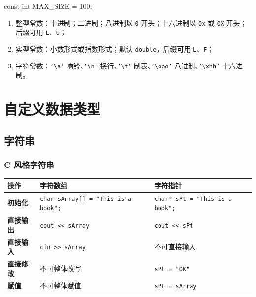 \documentclass[UTF8,fontset=fandol,zihao=5]{ctexart}
\newcommand{\code}[1]{\texttt{#1}}
\begin{document}
\begin{cppcode}
const int MAX_SIZE = 100;
\end{cppcode}

\begin{enumerate}
  \item 整型常数：十进制；二进制；八进制以 \code{0} 开头；十六进制以 \code{0x} 或 \code{0X} 开头；后缀可用 \code{L}、\code{U}；
  \item 实型常数：小数形式或指数形式；默认 \code{double}，后缀可用 \code{L}、\code{F}；
  \item 字符常数：\code{'\textbackslash a'} 响铃、\code{'\textbackslash n'} 换行、\code{'\textbackslash t'} 制表、\code{'\textbackslash ooo'} 八进制、\code{'\textbackslash xhh'} 十六进制。
\end{enumerate}

\section{自定义数据类型}

\subsection{字符串}

\subsubsection{C 风格字符串}

\begin{center}
\begin{tabularx}{0.94\textwidth}{>{\bfseries}p{2.2cm}X X}
\toprule
操作 & 字符数组 & 字符指针 \\
\midrule
初始化 & \code{char sArray[] = "This is a book";} & \code{char* sPt = "This is a book";} \\
直接输出 & \code{cout << sArray} & \code{cout << sPt} \\
直接输入 & \code{cin >> sArray} & 不可直接输入 \\
直接修改 & 不可整体改写 & \code{sPt = "OK"} \\
赋值 & 不可整体赋值 & \code{sPt = sArray} \\
\bottomrule
\end{tabularx}
\end{center}
\end{document}
